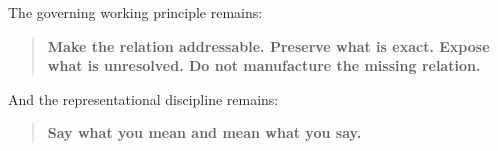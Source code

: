 The governing working principle remains:

\begin{quote}
\textbf{Make the relation addressable. Preserve what is exact. Expose
what is unresolved. Do not manufacture the missing relation.}
\end{quote}

And the representational discipline remains:

\begin{quote}
\textbf{Say what you mean and mean what you say.}
\end{quote}



